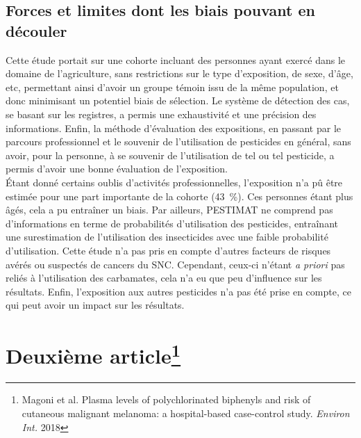 \documentclass[10pt]{article}
\begin{document}
\subsection{Forces et limites dont les biais pouvant en découler}
Cette étude portait sur une cohorte incluant des personnes ayant exercé dans le domaine de l'agriculture, sans restrictions sur le type d'exposition, de sexe, d'âge, etc, permettant ainsi d'avoir un groupe témoin issu de la même population, et donc minimisant un potentiel biais de sélection. Le système de détection des cas, se basant sur les registres, a permis une exhaustivité et une précision des informations. Enfin, la méthode d'évaluation des expositions, en passant par le parcours professionnel et le souvenir de l'utilisation de pesticides en général, sans avoir, pour la personne, à se souvenir de l'utilisation de tel ou tel pesticide, a permis d'avoir une bonne évaluation de l'exposition.\\

\'{E}tant donné certains oublis d'activités professionnelles, l'exposition n'a pû être estimée pour une part importante de la cohorte (43~\%). Ces personnes étant plus âgés, cela a pu entraîner un biais. Par ailleurs, PESTIMAT ne comprend pas d'informations en terme de probabilités d'utilisation des pesticides, entraînant une surestimation de l'utilisation des insecticides avec une faible probabilité d'utilisation. Cette étude n'a pas pris en compte d'autres facteurs de risques avérés ou suspectés de cancers du SNC. Cependant, ceux-ci n'étant \emph{a priori} pas reliés à l'utilisation des carbamates, cela n'a eu que peu d'influence sur les résultats. Enfin, l'exposition aux autres pesticides n'a pas été prise en compte, ce qui peut avoir un impact sur les résultats. 

\newpage
\section{Deuxième article\protect\footnote{Magoni et al. Plasma levels of polychlorinated biphenyls and risk of cutaneous malignant melanoma: a hospital-based case-control study. \emph{Environ Int.} 2018}}
\end{document}

